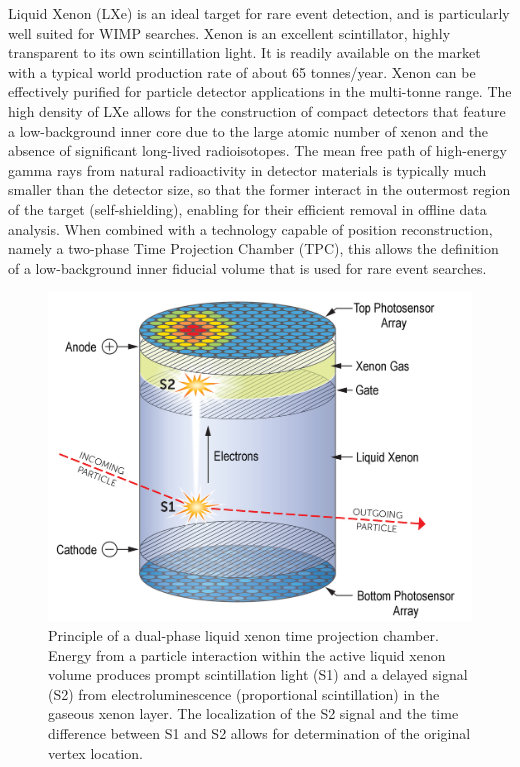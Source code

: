 Liquid Xenon (LXe) is an ideal target for rare event detection, and is particularly well suited for WIMP searches. Xenon is an excellent scintillator, highly transparent to its own scintillation light. It is readily available on the market with a typical world production rate of about 65 tonnes/year. Xenon can be effectively purified for particle detector applications in the multi-tonne range. The high density of LXe allows for the construction of compact detectors that feature a low-background inner core due to the large atomic number of xenon and the absence of significant long-lived radioisotopes. The mean free path of high-energy gamma rays from natural radioactivity in detector materials is typically much smaller than the detector size, so that the former interact in the outermost region of the target (self-shielding), enabling for their efficient removal in offline data analysis. When combined with a technology capable of position reconstruction, namely a two-phase Time Projection Chamber (TPC), this allows the definition of a low-background inner fiducial volume that is used for rare event searches.

\begin{figure}[!htbp]
\begin{center}
\includegraphics[width=0.99\columnwidth]{figures/xenon_fig_tpc-mo_lifton.jpg}
\caption{Principle of a dual-phase liquid xenon time projection chamber. Energy from a particle interaction within the active liquid xenon volume produces prompt scintillation light (S1) and a delayed  signal (S2) from electroluminescence (proportional scintillation) in the gaseous xenon layer. The localization of the S2 signal and the time difference between S1 and S2 allows for determination of the original vertex location.}\label{fig:tpcsketch}
\end{center}
\end{figure}



